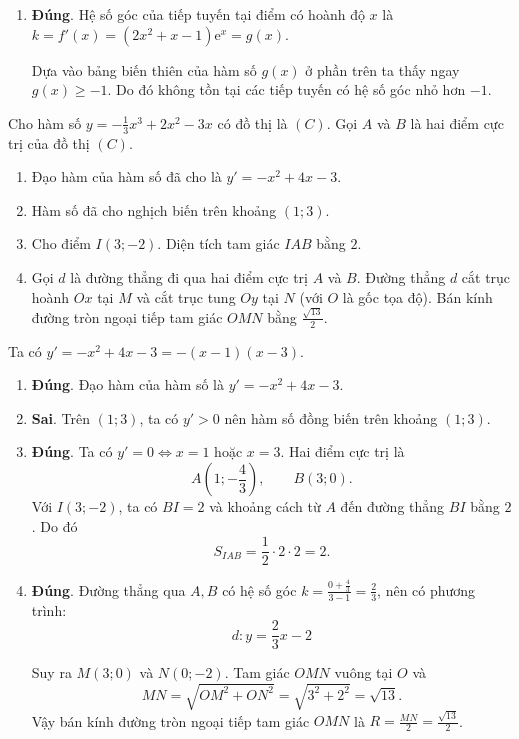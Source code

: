 \begin{baitap}
\begin{traloi}
\begin{enumerate}
			\item \textbf{Đúng}. Hệ số góc của tiếp tuyến tại điểm có hoành độ $x$ là $k = f'(x) = (2x^2 + x - 1)\mathrm{e}^x=g(x)$.
			
			Dựa vào bảng biến thiên của hàm số $ g(x) $ ở phần trên ta thấy ngay $ g(x) \geqslant -1 $. Do đó không tồn tại các tiếp tuyến có hệ số góc nhỏ hơn $-1$.
		\end{enumerate}
	\end{traloi}
\end{baitap}

\begin{baitap}
	Cho hàm số $y = -\frac{1}{3}x^3 + 2x^2 - 3x$ có đồ thị là $(C)$. Gọi $A$ và $B$ là hai điểm cực trị của đồ thị $(C)$.
	\begin{enumerate}
		\item Đạo hàm của hàm số đã cho là $y' = -x^2 + 4x - 3$.
		\item Hàm số đã cho nghịch biến trên khoảng $(1; 3)$.
		\item Cho điểm $I(3; -2)$. Diện tích tam giác $IAB$ bằng $2$.
		\item Gọi $d$ là đường thẳng đi qua hai điểm cực trị $A$ và $B$. Đường thẳng $d$ cắt trục hoành $Ox$ tại $M$ và cắt trục tung $Oy$ tại $N$ (với $O$ là gốc tọa độ). Bán kính đường tròn ngoại tiếp tam giác $OMN$ bằng $\frac{\sqrt{13}}{2}$.
	\end{enumerate}
	\begin{traloi}
		Ta có $y'=-x^2+4x-3=-(x-1)(x-3)$.
		
		\begin{enumerate}
			\item \textbf{Đúng}. Đạo hàm của hàm số là $y'=-x^2+4x-3$.
			
			\item \textbf{Sai}. Trên $(1;3)$, ta có $y'>0$ nên hàm số đồng biến trên khoảng $(1;3)$.
			
			\item \textbf{Đúng}. Ta có $y'=0\Leftrightarrow x=1$ hoặc $x=3$. Hai điểm cực trị là
			\[
			A\left(1;-\frac{4}{3}\right),\qquad B(3;0).
			\]
			Với $I(3;-2)$, ta có $BI=2$ và khoảng cách từ $A$ đến đường thẳng $BI$ bằng $2$. Do đó
			\[
			S_{IAB}=\frac{1}{2}\cdot2\cdot2=2.
			\]
			
			\item \textbf{Đúng}. Đường thẳng qua $A,B$ có hệ số góc
			$k=\frac{0+\frac43}{3-1}=\frac23$, nên có phương trình: $$d:y=\frac23x-2$$
			
			Suy ra $M(3;0)$ và $N(0;-2)$. Tam giác $OMN$ vuông tại $O$ và
			\[
			MN=\sqrt{OM^2+ON^2}=\sqrt{3^2+2^2}=\sqrt{13}.
			\]
			Vậy bán kính đường tròn ngoại tiếp tam giác $OMN$ là
			$R=\frac{MN}{2}=\frac{\sqrt{13}}{2}$.
		\end{enumerate}
	\end{traloi}
\end{baitap}
